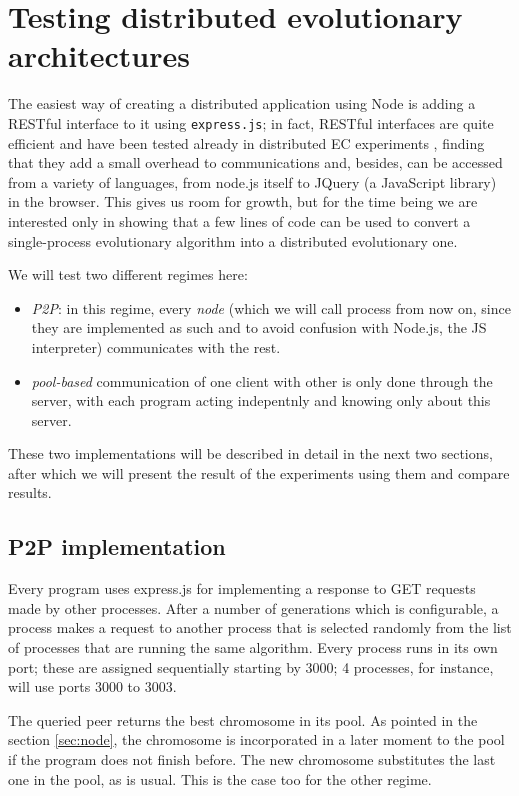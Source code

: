 \documentclass{sig-alternate}
\begin{document}
\section{Testing distributed evolutionary architectures}
\label{sec:dist}

The easiest way of creating a distributed application using Node is
adding a RESTful interface to it using {\tt express.js}; in fact,
RESTful interfaces are quite efficient and have been tested already in
distributed EC experiments \cite{DBLP:journals/corr/abs-1105-4978},
finding that they add a small overhead to communications and, besides,
can be accessed from a variety of languages, from node.js itself to
JQuery (a JavaScript library) in the browser. This gives us room for
growth, but for the time being we are interested only in showing that
a few lines of code can be used to convert a single-process
evolutionary algorithm into a distributed evolutionary one.

We will test two different regimes here:\begin{itemize}
\item {\em P2P}: in this regime, every {\em node} (which we will call
  process from now on, since they are implemented as such and to avoid
  confusion with Node.js, the JS interpreter) communicates with the
  rest.
\item {\em pool-based} communication of one client with other is only
  done through the server, with each program acting indepentnly and
  knowing only about this server. 
\end{itemize}

These two implementations will be described in detail in the next two
sections, after which we will present the result of the experiments
using them and compare results.

\subsection{P2P implementation}

Every program uses express.js for implementing a response to GET
requests made by other processes. After a number of generations which
is configurable, a process makes a request to another process that is
selected randomly from the list of processes that are running the same
algorithm. Every process runs in its own port; these are assigned
sequentially starting by 3000; 4 processes, for instance, will use
ports 3000 to 3003. 

The queried peer returns the best chromosome in its pool. As pointed
in the section \ref{sec:node}, the chromosome is incorporated in a
later moment to the pool if the program does not finish before. The
new chromosome substitutes the last one in the pool, as is usual. This
is the case too for the other regime. 
\end{document}
